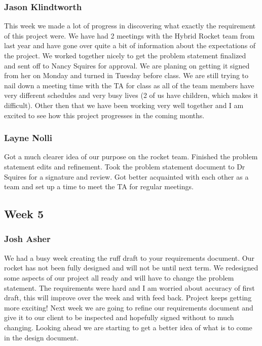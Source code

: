 \documentclass[10pt,draftclsnofoot,onecolumn]{IEEEtran}
\begin{document}
\subsubsection{Jason Klindtworth} This week we made a lot of progress in discovering what exactly the requirement of this project were. We have had 2 meetings with the Hybrid Rocket team from last year and have gone over quite a bit of information about the expectations of the project. We worked together nicely to get the problem statement finalized and sent off to Nancy Squires for approval. We are planing on getting it signed from her on Monday and turned in Tuesday before class. We are still trying to nail down a meeting time with the TA for class as all of the team members have very different schedules and very busy lives (2 of us have children, which makes it difficult). Other then that we have been working very well together and I am excited to see how this project progresses in the coming months.\par

\subsubsection{Layne Nolli} Got a much clearer idea of our purpose on the rocket team. Finished the problem statement edits and refinement. Took the problem statement document to Dr Squires for a signature and review. Got better acquainted with each other as a team and set up a time to meet the TA for regular meetings.\par

\subsection{Week 5}

\subsubsection{Josh Asher} We had a busy week creating the ruff draft to your requirements document. Our rocket has not been fully designed and will not be until next term. We redesigned some aspects of our project all ready and will have to change the problem statement. The requirements were hard and I am worried about accuracy of first draft, this will improve over the week and with feed back. Project keeps getting more exciting! Next week we are going to refine our requirements document and give it to our client to be inspected and hopefully signed without to much changing. Looking ahead we are starting to get a better idea of what is to come in the design document. \par
\end{document}
